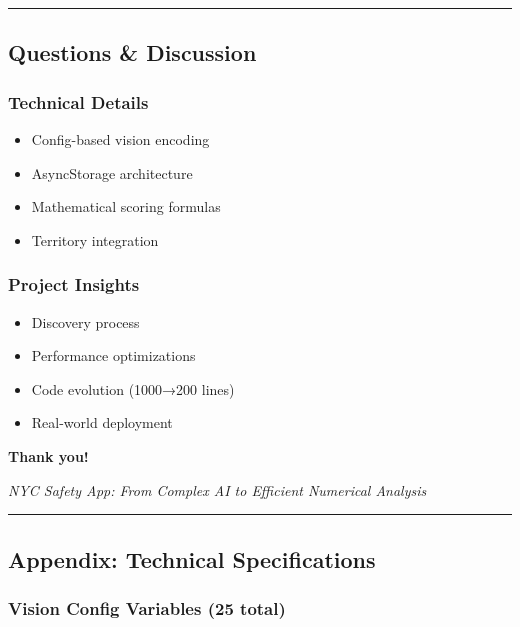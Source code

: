 \documentclass[
  letterpaper,
  DIV=11,
  numbers=noendperiod]{scrartcl}
\providecommand{\tightlist}{%
  \setlength{\itemsep}{0pt}\setlength{\parskip}{0pt}}
\begin{document}
\begin{center}\rule{0.5\linewidth}{0.5pt}\end{center}

\subsection{Questions \& Discussion}\label{questions-discussion}

\subsubsection{Technical Details}\label{technical-details}

\begin{itemize}
\tightlist
\item
  Config-based vision encoding
\item
  AsyncStorage architecture
\item
  Mathematical scoring formulas
\item
  Territory integration
\end{itemize}

\subsubsection{Project Insights}\label{project-insights}

\begin{itemize}
\tightlist
\item
  Discovery process
\item
  Performance optimizations
\item
  Code evolution (1000→200 lines)
\item
  Real-world deployment
\end{itemize}

\textbf{Thank you!} 🚀

\emph{NYC Safety App: From Complex AI to Efficient Numerical Analysis}

\begin{center}\rule{0.5\linewidth}{0.5pt}\end{center}

\subsection{Appendix: Technical
Specifications}\label{appendix-technical-specifications}

\subsubsection{Vision Config Variables (25
total)}\label{vision-config-variables-25-total}
\end{document}
